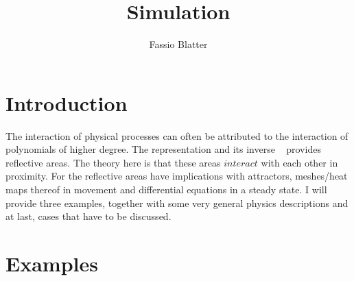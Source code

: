 \documentclass{report}
\begin{document}
\title{Simulation}
\author{Fassio Blatter}
\maketitle

\chapter{Introduction}
The interaction of physical processes can often be attributed to the interaction of polynomials of higher degree. The representation and its inverse ~\cite[Spline\_Axioms.tex]{Axioms} provides reflective areas. The theory here is that these areas $interact$ with each other in proximity. For the reflective areas have implications with attractors, meshes/heat maps thereof in movement and differential equations in a steady state. I will provide three examples, together with some very general physics descriptions and at last, cases that have to be discussed.

\chapter{Examples}
\end{document}

